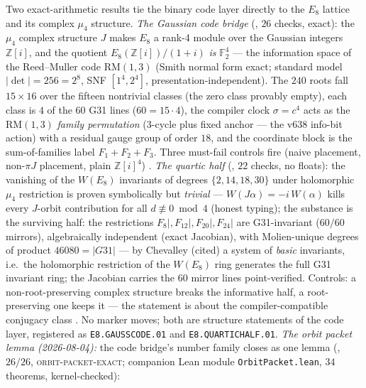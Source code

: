 \begin{keybox}
Two exact-arithmetic results tie the binary code layer directly to
the $E_8$ lattice and its complex $\mu_4$ structure.  \emph{The
Gaussian code bridge} (, $26$
checks, exact): the $\mu_4$ complex structure $J$ makes $E_8$ a
rank-4 module over the Gaussian integers $\mathbb{Z}[i]$, and the
quotient $E_8(\mathbb{Z}[i])/(1+i)$ \emph{is} $\mathbb{F}_2^4$ ---
the information space of the Reed--Muller code $\mathrm{RM}(1,3)$
(Smith normal form exact; standard model $|\det|=256=2^8$, SNF
$[1^4,2^4]$, presentation-independent).  The $240$ roots fall
$15\times16$ over the fifteen nontrivial classes (the zero class
provably empty), each class is $4$ of the $60$ G31 lines
($60=15\cdot4$), the compiler clock $\sigma=c^4$ acts as the
$\mathrm{RM}(1,3)$ \emph{family permutation} (3-cycle plus fixed
anchor --- the v638 info-bit action) with a residual gauge group of
order $18$, and the coordinate block is the sum-of-families label
$F_1{+}F_2{+}F_3$.  Three must-fail controls fire (naive placement,
non-$\pi J$ placement, plain $\mathbb{Z}[i]^4$) \mE.  \emph{The
quartic half} (, $22$ checks, no
floats): the vanishing of the $W(E_8)$ invariants of degrees
$\{2,14,18,30\}$ under holomorphic $\mu_4$ restriction is proven
symbolically but \emph{trivial} --- $W(J\alpha)=-i\,W(\alpha)$ kills
every $J$-orbit contribution for all $d\not\equiv0\bmod4$ (honest
typing); the substance is the surviving half: the restrictions
$F_8|,F_{12}|,F_{20}|,F_{24}|$ are G31-invariant ($60/60$ mirrors),
algebraically independent (exact Jacobian), with Molien-unique
degrees of product $46080=|G31|$ --- by Chevalley (cited) a system
of \emph{basic} invariants, i.e.\ the holomorphic restriction of
the $W(E_8)$ ring generates the full G31 invariant ring; the
Jacobian carries the $60$ mirror lines point-verified.  Controls: a
non-root-preserving complex structure breaks the informative half,
a root-preserving one keeps it --- the statement is about the
compiler-compatible conjugacy class \mE.  No marker moves; both are
structure statements of the code layer, registered as
\texttt{E8.GAUSSCODE.01} and \texttt{E8.QUARTICHALF.01}.
\emph{The orbit packet lemma (2026-08-04):} the code bridge's number
family closes as one lemma (, $26/26$,
\textsc{orbit-packet-exact}; companion Lean module
\texttt{OrbitPacket.lean}, $34$ theorems, kernel-checked):
\begin{center}

\end{center}
\end{keybox}
